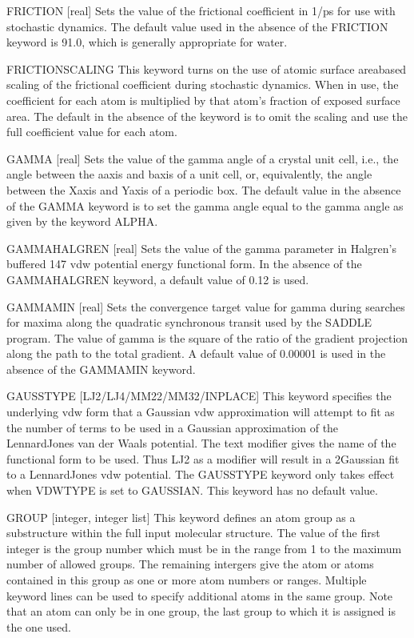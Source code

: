 \documentclass[letterpaper,11pt,english]{sphinxmanual}
\begin{document}
FRICTION {[}real{]}     Sets the value of the frictional coefficient in 1/ps for use with stochastic dynamics. The default value used in the absence of the FRICTION keyword is 91.0, which is generally appropriate for water.

FRICTION\sphinxhyphen{}SCALING     This keyword turns on the use of atomic surface area\sphinxhyphen{}based scaling of the frictional coefficient during stochastic dynamics. When in use, the coefficient for each atom is multiplied by that atom’s fraction of exposed surface area. The default in the absence of the keyword is to omit the scaling and use the full coefficient value for each atom.

GAMMA {[}real{]}     Sets the value of the gamma angle of a crystal unit cell, i.e., the angle between the a\sphinxhyphen{}axis and b\sphinxhyphen{}axis of a unit cell, or, equivalently, the angle between the X\sphinxhyphen{}axis and Y\sphinxhyphen{}axis of a periodic box. The default value in the absence of the GAMMA keyword is to set the gamma angle equal to the gamma angle as given by the keyword ALPHA.

GAMMA\sphinxhyphen{}HALGREN {[}real{]}     Sets the value of the gamma parameter in Halgren’s buffered 14\sphinxhyphen{}7 vdw potential energy functional form. In the absence of the GAMMA\sphinxhyphen{}HALGREN keyword, a default value of 0.12 is used.

GAMMAMIN {[}real{]}     Sets the convergence target value for gamma during searches for maxima along the quadratic synchronous transit used by the SADDLE program. The value of gamma is the square of the ratio of the gradient projection along the path to the total gradient. A default value of 0.00001 is used in the absence of the GAMMAMIN keyword.

GAUSSTYPE {[}LJ\sphinxhyphen{}2/LJ\sphinxhyphen{}4/MM2\sphinxhyphen{}2/MM3\sphinxhyphen{}2/IN\sphinxhyphen{}PLACE{]}     This keyword specifies the underlying vdw form that a Gaussian vdw approximation will attempt to fit as the number of terms to be used in a Gaussian approximation of the Lennard\sphinxhyphen{}Jones van der Waals potential. The text modifier gives the name of the functional form to be used. Thus LJ\sphinxhyphen{}2 as a modifier will result in a 2\sphinxhyphen{}Gaussian fit to a Lennard\sphinxhyphen{}Jones vdw potential. The GAUSSTYPE keyword only takes effect when VDWTYPE is set to GAUSSIAN. This keyword has no default value.

GROUP {[}integer, integer list{]}     This keyword defines an atom group as a substructure within the full input molecular structure. The value of the first integer is the group number which must be in the range from 1 to the maximum number of allowed groups. The remaining intergers give the atom or atoms contained in this group as one or more atom numbers or ranges. Multiple keyword lines can be used to specify additional atoms in the same group. Note that an atom can only be in one group, the last group to which it is assigned is the one used.
\end{document}
